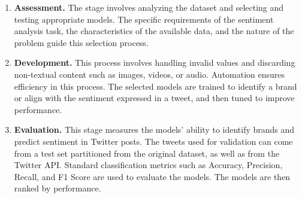 \documentclass{article}
\begin{document}
\begin{enumerate}[leftmargin=*]

    \item \textbf{Assessment.} The stage involves analyzing the dataset and selecting and testing appropriate models. The specific requirements of the sentiment analysis task, the characteristics of the available data, and the nature of the problem guide this selection process.

    \item \textbf{Development.} This process involves handling invalid values and discarding non-textual content such as images, videos, or audio. Automation ensures efficiency in this process. The selected models are trained to identify a brand or align with the sentiment expressed in a tweet, and then tuned to improve performance.

    \item \textbf{Evaluation.} This stage measures the models' ability to identify brands and predict sentiment in Twitter posts. The tweets used for validation can come from a test set partitioned from the original dataset, as well as from the Twitter API. Standard classification metrics such as Accuracy, Precision, Recall, and F1 Score are used to evaluate the models. The models are then ranked by performance.

\end{enumerate}
\end{document}

